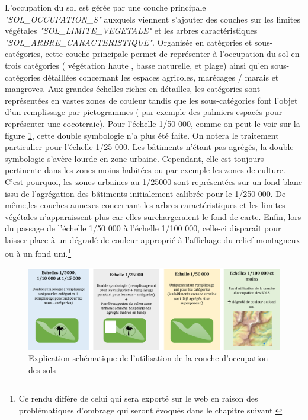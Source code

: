 L'occupation du sol est gérée par une couche principale \textit{"SOL\_OCCUPATION\_S"} auxquels viennent s'ajouter des couches sur les limites végétales \textit{"SOL\_LIMITE\_VEGETALE"} et les arbres caractéristiques \textit{"SOL\_ARBRE\_CARACTERISTIQUE"}.  Organisée en catégories et sous-catégories, cette couche principale permet de représenter à l'occupation du sol en trois catégories ( végétation haute , basse naturelle, et plage) ainsi qu'en sous-catégories détaillées concernant les espaces agricoles, marécages / marais et mangroves. Aux grandes échelles riches en détailles, les catégories sont représentées en vastes zones de couleur tandis que les sous-catégories font l'objet d'un remplissage par pictogrammes ( par exemple des palmiers espacés pour représenter une cocoteraie). Pour l'échelle 1/50 000, comme on peut le voir sur la figure \ref{ocs}, cette double symbologie n'a plus été faite. On notera le traitement particulier pour l'échelle 1/25 000. Les bâtiments n'étant pas agrégés, la double symbologie s'avère lourde en zone urbaine.  Cependant, elle est toujours pertinente dans les zones moins habitées ou par exemple les zones de culture. C'est pourquoi, les zones urbaines au 1/25000 sont représentées sur un fond blanc issu de l'agrégation des bâtiments initialement calibrée pour le 1/250 000. De même,les couches annexes concernant les arbres caractéristiques et les limites végétales n'apparaissent plus car elles surchargeraient le fond de carte. Enfin, lors du passage de l'échelle 1/50 000 à l'échelle 1/100 000, celle-ci disparaît pour laisser place à un dégradé de couleur approprié à l'affichage du relief montagneux ou à un fond uni.\footnote{Ce rendu diffère de celui qui sera exporté sur le web en raison des problématiques d'ombrage qui seront évoqués dans le chapitre suivant.}

\begin{figure}[ht]
\centering
\includegraphics[width=\linewidth]{images/chap2/OCS.png}
\caption{Explication schématique de l'utilisation de la couche d'occupation des sols}
\label{ocs}
\end{figure}

